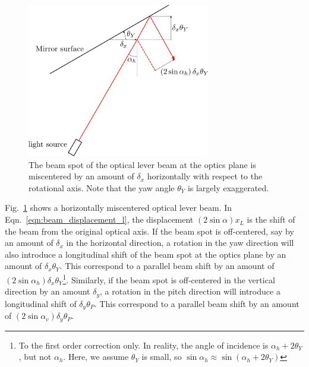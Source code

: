 \begin{figure}[!h]
	\centering
	\includegraphics[width=80mm]{figures/miscentered}
	\caption{The beam spot of the optical lever beam at the optics plane is miscentered by an amount of $\delta_x$ horizontally with respect to the rotational axis. Note that the yaw angle $\theta_Y$ is largely exaggerated.}
	\label{fig:miscentered}
\end{figure}
Fig.~\ref{fig:miscentered} shows a horizontally miscentered optical lever beam.
In Eqn.~\eqref{eqn:beam_displacement_l}, the displacement $\left(2\sin\alpha\right)x_L$ is the shift of the beam from the original optical axis.
If the beam spot is off-centered, say by an amount of $\delta_x$ in the horizontal direction, a rotation in the yaw direction will also introduce a longitudinal shift of the beam spot at the optics plane by an amount of $\delta_x\theta_Y$. 
This correspond to a parallel beam shift by an amount of $\left(2\sin\alpha_h\right)\delta_x\theta_Y$\footnote{To the first order correction only. In reality, the angle of incidence is $\alpha_h+2\theta_Y$, but not $\alpha_h$. Here, we assume $\theta_Y$ is small, so $\sin\alpha_h \approx \sin{\left(\alpha_h+2\theta_Y\right)}$}.
Similarly, if the beam spot is off-centered in the vertical direction by an amount $\delta_y$, a rotation in the pitch direction will introduce a longitudinal shift of $\delta_y\theta_P$.
This correspond to a parallel beam shift by an amount of $\left(2\sin\alpha_v\right)\delta_y\theta_P$.

